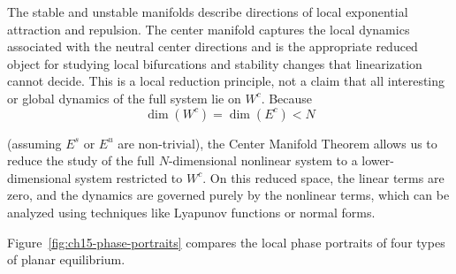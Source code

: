 \begin{remark}
The stable and unstable manifolds describe directions of local
exponential attraction and repulsion. The center manifold captures the
local dynamics associated with the neutral center directions and is the
appropriate reduced object for studying local bifurcations and stability
changes that linearization cannot decide. This is a local reduction
principle, not a claim that all interesting or global dynamics of the
full system lie on $W^c$. Because
\[
\dim(W^c) = \dim(E^c) < N
\]

 (assuming $E^s$ or $E^u$ are non-trivial), the Center Manifold Theorem allows us to reduce the study of the full $N$-dimensional nonlinear system to a lower-dimensional system restricted to $W^c$. On this reduced space, the linear terms are zero, and the dynamics are governed purely by the nonlinear terms, which can be analyzed using techniques like Lyapunov functions or normal forms.
\end{remark}

Figure~\ref{fig:ch15-phase-portraits} compares the local phase portraits of four types of planar equilibrium.

